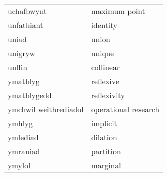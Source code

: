 \begin{supertabular}{p{0.22\textwidth}p{0.22\textwidth}}
uchafbwynt & maximum point \\
unfathiant & identity \\
uniad & union \\
unigryw & unique \\
unllin & collinear \\
ymatblyg & reflexive \\
ymatblygedd & reflexivity \\
ymchwil weithrediadol & operational research \\
ymhlyg & implicit \\
ymlediad & dilation \\
ymraniad & partition \\
ymylol & marginal \\
\end{supertabular}
